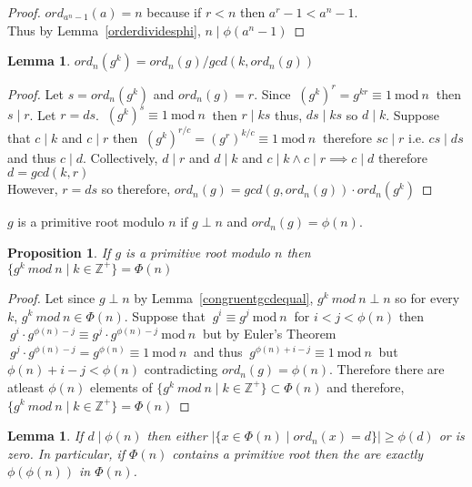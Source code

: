 \documentclass[12pt]{extarticle}
\renewcommand\qedsymbol{$\square$}
\newcommand{\divides}{\mid}
\newcommand{\Zplus}{\mathbb{Z}^{+}}
\newtheorem{lemma}[theorem]{Lemma}
\newtheorem{proposition}[theorem]{Proposition}
\newenvironment{definition}[1][Definition:]{\begin{trivlist}
\item[\hskip \labelsep {\bfseries #1}]}{\end{trivlist}}
\newenvironment{lproof}{\begin{proof} \renewcommand{\qedsymbol}{}}{\end{proof}}
\renewcommand{\mod}[3]{\: #1 \equiv #2 \: \mathrm{mod} \: #3 \:}
\begin{document}
\begin{lproof}
$ord_{a^n-1}(a) = n$ because if $r < n$ then $a^r - 1 < a^n - 1$. \\ Thus by Lemma~\ref{orderdividesphi}, $n \divides \phi (a^n - 1)$
\end{lproof}

\begin{lemma}
\label{orderofpowers}
$ord_n(g^k) = ord_n(g)/gcd(k, ord_n(g))$
\end{lemma}

\begin{lproof}
Let $s = ord_n(g^k)$ and $ord_n(g) = r$. Since $\mod{(g^k)^r = g^{kr}}{1}{n}$ then $s \divides r$. Let $r = ds$. $\mod{(g^k)^s}{1}{n}$ then $r \divides ks$ thus, $ds \divides ks$ so $d \divides k$. Suppose that $c \divides k$ and $c \divides r$ then $\mod{(g^k)^{r/c} = (g^r)^{k/c}}{1}{n}$ therefore $sc \divides r$ i.e. $cs \divides ds$ and thus $c \divides d$.  Collectively, $d \divides r$ and $d \divides k$ and $c \divides k \wedge c \divides r \implies c \divides d$  therefore $d = gcd(k,r)$ \\
However, $r = ds$ so therefore, $ord_n(g) = gcd(g,ord_n(g)) \cdot ord_n(g^k)$
\end{lproof}

\begin{definition}
$g$ is a primitive root modulo $n$ if $g \perp n$ and  $ord_n(g) = \phi (n)$.
\end{definition}


\begin{proposition}
\label{prootsgenerate}
If $g$ is a primitive root modulo $n$ then $\{g^k \: mod \: n \mid k \in \Zplus \} = \Phi (n)$
\end{proposition}


\begin{lproof}
Let since $g \perp n$ by Lemma~\ref{congruentgcdequal}, $g^k \: mod \: n \perp n$ so for every $k$, $g^k \: mod \: n \in \Phi (n)$. Suppose that $\mod{g^i}{g^j}{n}$ for $i < j < \phi (n)$ then $\mod{g^i \cdot g^{\phi (n) - j}}{g^j \cdot g^{\phi (n) - j}}{n}$ but by Euler's Theorem $\mod{g^j \cdot g^{\phi (n) - j} = g^{\phi (n)}}{1}{n}$ and thus $\mod{g^{\phi (n) + i - j}}{1}{n}$ but $\phi (n) + i - j < \phi (n)$ contradicting $ord_n (g) = \phi (n)$. Therefore there are atleast $\phi (n)$ elements of $\{g^k \: mod \: n \mid k \in \Zplus \} \subset \Phi (n)$ and therefore, $\{g^k \: mod \: n \mid k \in \Zplus \} = \Phi (n)$
\end{lproof}

\begin{lemma}
\label{numberofprimroots}
If $d \divides \phi (n)$ then either $|\{x \in \Phi (n) \mid ord_n(x) = d\} | \ge \phi (d)$ or is zero. In particular, if $\Phi (n)$ contains a primitive root then the are exactly $\phi (\phi (n))$ in $\Phi (n)$.
\end{lemma}
\end{document}
